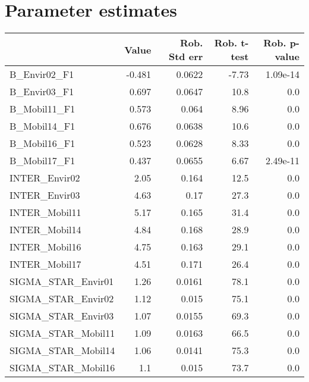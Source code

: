 \section{Parameter estimates}
\begin{tabular}{lrrrr}
\toprule
{} &   Value &  Rob. Std err &  Rob. t-test &  Rob. p-value \\
\midrule
B\_Envir02\_F1         &  -0.481 &        0.0622 &        -7.73 &      1.09e-14 \\
B\_Envir03\_F1         &   0.697 &        0.0647 &         10.8 &           0.0 \\
B\_Mobil11\_F1         &   0.573 &         0.064 &         8.96 &           0.0 \\
B\_Mobil14\_F1         &   0.676 &        0.0638 &         10.6 &           0.0 \\
B\_Mobil16\_F1         &   0.523 &        0.0628 &         8.33 &           0.0 \\
B\_Mobil17\_F1         &   0.437 &        0.0655 &         6.67 &      2.49e-11 \\
INTER\_Envir02        &    2.05 &         0.164 &         12.5 &           0.0 \\
INTER\_Envir03        &    4.63 &          0.17 &         27.3 &           0.0 \\
INTER\_Mobil11        &    5.17 &         0.165 &         31.4 &           0.0 \\
INTER\_Mobil14        &    4.84 &         0.168 &         28.9 &           0.0 \\
INTER\_Mobil16        &    4.75 &         0.163 &         29.1 &           0.0 \\
INTER\_Mobil17        &    4.51 &         0.171 &         26.4 &           0.0 \\
SIGMA\_STAR\_Envir01   &    1.26 &        0.0161 &         78.1 &           0.0 \\
SIGMA\_STAR\_Envir02   &    1.12 &         0.015 &         75.1 &           0.0 \\
SIGMA\_STAR\_Envir03   &    1.07 &        0.0155 &         69.3 &           0.0 \\
SIGMA\_STAR\_Mobil11   &    1.09 &        0.0163 &         66.5 &           0.0 \\
SIGMA\_STAR\_Mobil14   &    1.06 &        0.0141 &         75.3 &           0.0 \\
SIGMA\_STAR\_Mobil16   &     1.1 &         0.015 &         73.7 &           0.0 \\

\end{tabular}

